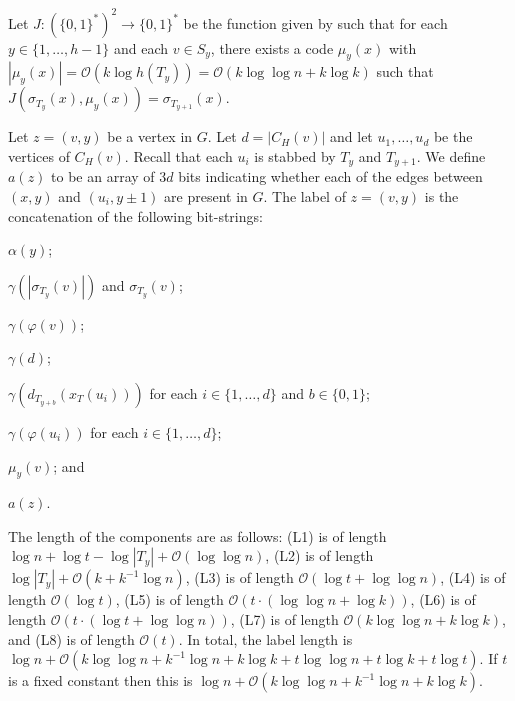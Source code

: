 \documentclass[kpfonts]{patmorin}
\newcommand{\snote}[1]{\fcolorbox{red}{yellow}{#1}}
\newcommand{\Oh}{\mathcal{O}}
\begin{document}
Let $J:(\{0,1\}^{*})^2\to\{0,1\}^*$ be the function given by  such that
for each $y\in\{1,\ldots,h-1\}$ and each $v\in S_{y}$,
there exists a code $\mu_{y}(x)$ with $|\mu_{y}(x)|=\Oh(k\log h(T_{y}))=\Oh(k\log\log n+k \log k)$ such that $J(\sigma_{T_{y}}(x),\mu_{y}(x))=\sigma_{T_{y+1}}(x)$.


Let $z=(v,y)$ be a vertex in $G$.
Let $d = |C_{H}(v)|$ and let $u_1,\ldots,u_d$ be the vertices of $C_H(v)$. 
Recall that each $u_i$ is stabbed by $T_y$ and $T_{y+1}$.
We define $a(z)$ to be an array of $3d$ bits indicating whether 
each of the edges between $(x,y)$ and $(u_i,y\pm1)$ are present in $G$. 
The label of $z=(v,y)$ is the concatenation of the following bit-strings:

\begin{compactenum}[(L1)]
  \item\label{label-alpha} $\alpha(y)$;%
  \item $\gamma(|\sigma_{T_y}(v)|)$ and $\sigma_{T_y}(v)$; %
  \item $\gamma(\varphi(v))$;
  \item $\gamma(d)$;
  \item $\gamma(d_{T_{y+b}}(x_T(u_i)))$ for each $i\in\{1,\ldots,d\}$ and $b\in\{0,1\}$;
  \item $\gamma(\varphi(u_i))$ for each $i\in\{1,\ldots,d\}$;
  \item $\mu_y(v)$; and
  \item $a(z)$.
  \end{compactenum}
The length of the components are as follows: 
(L1) is of length $\log n + \log t -\log|T_y| + \Oh(\log\log n)$, 
(L2) is of length $\log|T_y| + \Oh(k+k^{-1}\log n)$, 
(L3) is of length $\Oh(\log t + \log\log n)$,
(L4) is of length $\Oh(\log t)$, 
(L5) is of length $\Oh(t\cdot (\log\log n + \log k))$, %
(L6) is of length $\Oh(t\cdot (\log t + \log\log n))$, 
(L7) is of length $\Oh(k\log\log n + k\log k)$, and 
(L8) is of length $\Oh(t)$.
In total, the label length is $\log n + \Oh(k\log\log n+k^{-1}\log n + k\log k + t \log\log n + t \log k + t \log t)$.
If $t$ is a fixed constant then this is  
$\log n + \Oh(k\log\log n+k^{-1}\log n + k\log k)$.
\end{document}
